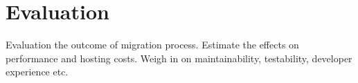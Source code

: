\chapter{Evaluation}

Evaluation the outcome of migration process. Estimate the effects on performance and hosting costs. Weigh in on maintainability, testability, developer experience etc.
